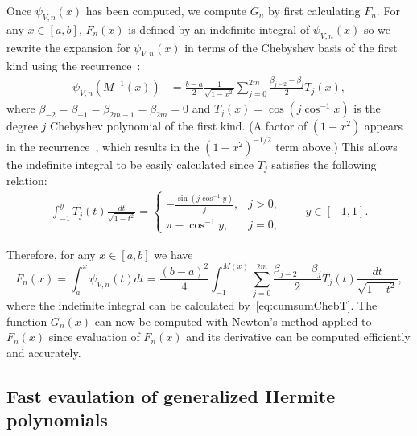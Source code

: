 \documentclass[final]{siamltex}
\begin{document}
Once $\psi_{V,n}(x)$ has been computed, we compute $G_n$ by first calculating $F_n$. For any $x\in[a,b]$, $F_n(x)$ 
is defined by an indefinite integral of $\psi_{V,n}(x)$ so we rewrite the expansion for $\psi_{V,n}(x)$ in terms 
of the Chebyshev basis of the first kind using the recurrence~\cite[(18.9.10)]{NISTHandbook}:
\begin{align*}
\psi_{V,n}\left(M^{-1}(x) \right) &= \frac{b-a}{2} \frac{1}{\sqrt{1-x^2}} \sum_{j=0}^{2m} \frac{\beta_{j-2}-\beta_j}{2}T_j(x),
\end{align*}
where $\beta_{-2}=\beta_{-1}=\beta_{2m-1}=\beta_{2m}=0$ and $T_j(x) = \cos(j\cos^{-1}x)$ is the degree $j$ Chebyshev polynomial of the first kind. (A factor of $(1-x^2)$ appears in the recurrence~\cite[(18.9.10)]{NISTHandbook}, which results in the $(1-x^2)^{-1/2}$ term above.)  This 
allows the indefinite integral to be easily calculated since $T_j$ satisfies the following relation: 
\begin{align}\label{eq:cumsumChebT}
\int_{-1}^y T_j(t) \frac{dt}{\sqrt{1-t^2}} = \begin{cases} -\frac{\sin (j \cos^{-1} y)}{j}, & j >0,\\
\pi - \cos^{-1} y, & j = 0,
\end{cases}\qquad y\in[-1,1].
\end{align}

Therefore, for any $x\in[a,b]$ we have
\[
F_n(x) = \int_{a}^x \psi_{V,n}(t) dt = \frac{(b-a)^2}{4} \int_{-1}^{M(x)} \sum_{j=0}^{2m} \frac{\beta_{j-2}-\beta_j}{2}T_j(t) \frac{dt}{\sqrt{1-t^2}},
\]
where the indefinite integral can be calculated by~\eqref{eq:cumsumChebT}. 
The function $G_n(x)$ can now be computed with Newton's method applied to $F_n(x)$ since evaluation of $F_n(x)$ and its derivative can 
be computed efficiently and accurately.

\subsection{Fast evaulation of generalized Hermite polynomials}\label{sec:RH}
\end{document}
